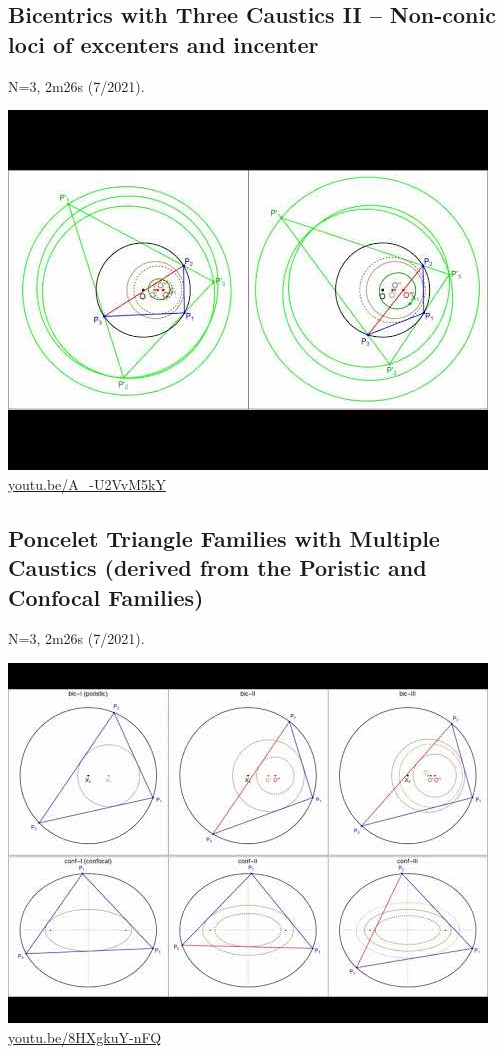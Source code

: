 \documentclass[12pt]{amsart}
\begin{document}
\subsection{Bicentrics with Three Caustics II -- Non-conic loci of excenters and  incenter}
\label{vid:A_-U2VvM5kY}
\noindent N=3, 2m26s (7/2021). 
\begin{center}\includegraphics[width=.5\textwidth]{pics/A_-U2VvM5kY.jpg} \\ 
\href{https://youtu.be/A_-U2VvM5kY}{\url{youtu.be/A\_-U2VvM5kY}}\end{center}
% 
\subsection{Poncelet Triangle Families with Multiple Caustics (derived from the Poristic and Confocal Families)}
\label{vid:8HXgkuY-nFQ}
\noindent N=3, 2m26s (7/2021). 
\begin{center}\includegraphics[width=.5\textwidth]{pics/8HXgkuY-nFQ.jpg} \\ 
\href{https://youtu.be/8HXgkuY-nFQ}{\url{youtu.be/8HXgkuY-nFQ}}\end{center}
% 
\end{document}
